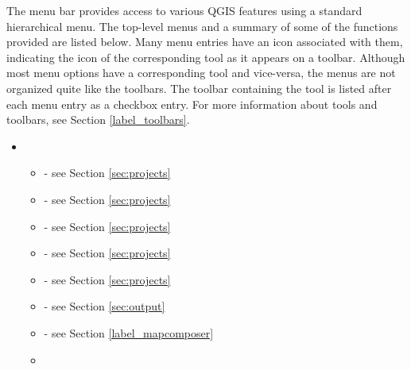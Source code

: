 The menu bar provides access to various QGIS features using a standard 
hierarchical menu. The top-level menus and a summary of some of the
functions provided are listed below. 
Many menu entries have an icon associated with them, indicating the icon
of the corresponding tool as it appears on a toolbar.
Although most menu options have a corresponding tool and vice-versa,
the menus are not organized quite like the toolbars. 
The toolbar containing the tool is listed after each menu entry as a checkbox
entry. For more information about tools and toolbars, see Section \ref{label_toolbars}.


\begin{itemize}
\item {}
\begin{itemize}
\item {}
	- see Section \ref{sec:projects}
\item {}
	- see Section \ref{sec:projects}
\item {}
	- see Section \ref{sec:projects}
\item {}
	- see Section \ref{sec:projects}
\item {}
  - see Section \ref{sec:projects}
\item {}
	- see Section \ref{sec:output}
\item {}
	- see Section \ref{label_mapcomposer}
\item {}
\end{itemize}


\end{itemize}
